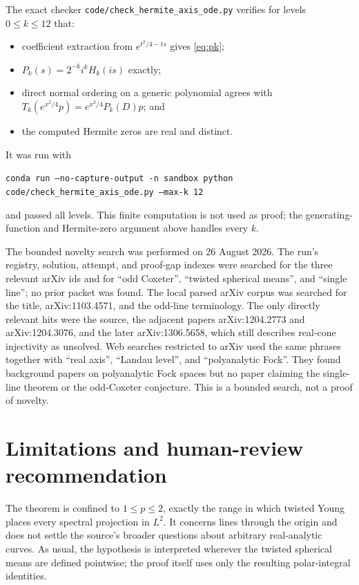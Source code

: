 \documentclass[11pt]{article}
\begin{document}
The exact checker
\texttt{code/check\_hermite\_axis\_ode.py} verifies for levels
$0\le k\le12$ that:
\begin{itemize}
\item coefficient extraction from $e^{t^2/4-ts}$ gives \eqref{eq:pk};
\item $P_k(s)=2^{-k}i^kH_k(is)$ exactly;
\item direct normal ordering on a generic polynomial agrees with
      $T_k(e^{x^2/4}p)=e^{x^2/4}P_k(D)p$; and
\item the computed Hermite zeros are real and distinct.
\end{itemize}
It was run with
\begin{center}
\texttt{conda run --no-capture-output -n sandbox python\\
code/check\_hermite\_axis\_ode.py --max-k 12}
\end{center}
and passed all levels.  This finite computation is not used as proof; the
generating-function and Hermite-zero argument above handles every $k$.

The bounded novelty search was performed on 26 August 2026.  The run's
registry, solution, attempt, and proof-gap indexes were searched for the
three relevant arXiv ids and for ``odd Coxeter'', ``twisted spherical means'',
and ``single line''; no prior packet was found.  The local parsed arXiv corpus
was searched for the title, arXiv:1103.4571, and the odd-line terminology.
The only directly relevant hits were the source, the adjacent papers
arXiv:1204.2773 and arXiv:1204.3076, and the later arXiv:1306.5658, which still
describes real-cone injectivity as unsolved.  Web searches restricted to
arXiv used the same phrases together with ``real axis'', ``Landau level'',
and ``polyanalytic Fock''.  They found background papers on polyanalytic Fock
spaces but no paper claiming the single-line theorem or the odd-Coxeter
conjecture.  This is a bounded search, not a proof of novelty.

\section*{Limitations and human-review recommendation}

The theorem is confined to $1\le p\le2$, exactly the range in which twisted
Young places every spectral projection in $L^2$.  It concerns lines through
the origin and does not settle the source's broader questions about arbitrary
real-analytic curves.  As usual, the hypothesis is interpreted wherever the
twisted spherical means are defined pointwise; the proof itself uses only the
resulting polar-integral identities.
\end{document}
